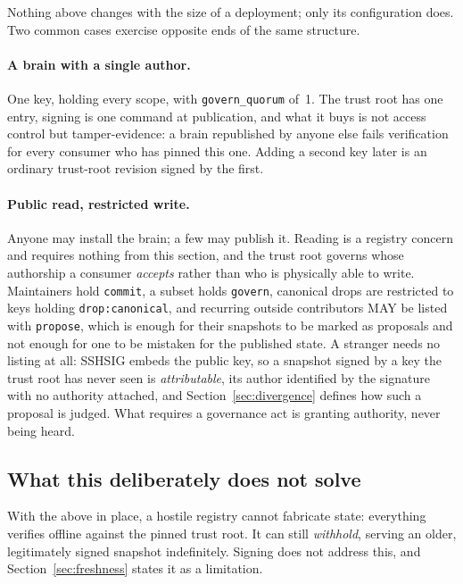 \documentclass[11pt,a4paper]{article}
\begin{document}
Nothing above changes with the size of a deployment; only its configuration
does. Two common cases exercise opposite ends of the same structure.

\paragraph{A brain with a single author.}
One key, holding every scope, with \texttt{govern\_quorum} of~1. The trust
root has one entry, signing is one command at publication, and what it buys is
not access control but tamper-evidence: a brain republished by anyone else
fails verification for every consumer who has pinned this one. Adding a second
key later is an ordinary trust-root revision signed by the first.

\paragraph{Public read, restricted write.}
Anyone may install the brain; a few may publish it. Reading is a registry
concern and requires nothing from this section, and the trust root governs whose
authorship a consumer \emph{accepts} rather than who is physically able to
write. Maintainers hold \texttt{commit}, a subset holds \texttt{govern}, canonical
drops are restricted to keys holding \texttt{drop:canonical}, and recurring
outside contributors MAY be listed with \texttt{propose}, which is enough for
their snapshots to be marked as proposals and not enough for one to be
mistaken for the published state. A stranger needs no listing at all: SSHSIG
embeds the public key, so a snapshot signed by a key the trust root has never
seen is \emph{attributable}, its author identified by the signature with no
authority attached, and Section~\ref{sec:divergence} defines how such a
proposal is judged. What requires a governance act is granting authority,
never being heard.

\subsection{What this deliberately does not solve}

With the above in place, a hostile registry cannot fabricate state: everything
verifies offline against the pinned trust root. It can still \emph{withhold},
serving an older, legitimately signed snapshot indefinitely. Signing does not
address this, and Section~\ref{sec:freshness} states it as a limitation.
\end{document}
